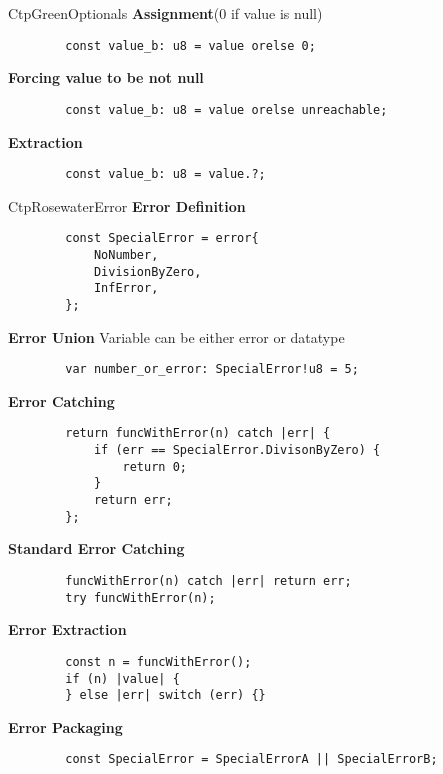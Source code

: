 \documentclass[10pt,a4paper]{article}
\begin{document}
\begin{multicols*}{3}
\begin{mycolorbox}{CtpGreen}{Optionals}
	\textbf{Assignment}(0 if value is null)
	\begin{verbatim}
		const value_b: u8 = value orelse 0;
	\end{verbatim}
	
	\textbf{Forcing value to be not null}
	\begin{verbatim}
		const value_b: u8 = value orelse unreachable;
	\end{verbatim}

	\textbf{Extraction}
	\begin{verbatim}
		const value_b: u8 = value.?;
	\end{verbatim}
\end{mycolorbox}

\begin{mycolorbox}{CtpRosewater}{Error}
	\textbf{Error Definition}
	\begin{verbatim}
		const SpecialError = error{
			NoNumber,
			DivisionByZero,
			InfError,
		};
	\end{verbatim}

	\textbf{Error Union} Variable can be either error or datatype
	\begin{verbatim}
		var number_or_error: SpecialError!u8 = 5;
	\end{verbatim}

	\textbf{Error Catching}
	\begin{verbatim}
		return funcWithError(n) catch |err| {
			if (err == SpecialError.DivisonByZero) {
				return 0;
			}
			return err;
		};
	\end{verbatim}

	\textbf{Standard Error Catching}
	\begin{verbatim}
		funcWithError(n) catch |err| return err;
		try funcWithError(n);
	\end{verbatim}

	\textbf{Error Extraction}
	\begin{verbatim}
		const n = funcWithError();
		if (n) |value| {
		} else |err| switch (err) {}
	\end{verbatim}

	\textbf{Error Packaging}
	\begin{verbatim}
		const SpecialError = SpecialErrorA || SpecialErrorB;
	\end{verbatim}
\end{mycolorbox}



\end{multicols*}
\end{document}
